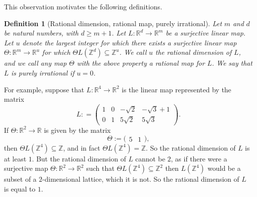 \documentclass[12pt,a4paper,twoside,reqno]{amsart}
\newtheorem{Definition}[Theorem]{Definition}
\newtheorem{Remark}[Theorem]{Remark}
\numberwithin{equation}{section}
\begin{document}
This observation motivates the following definitions.

\begin{Definition}[Rational dimension, rational map, purely irrational]
\label{Definition rational space}
Let $m$ and $d$ be natural numbers, with $d\geqslant m+1$. Let $L:\mathbb{R}^d\longrightarrow \mathbb{R}^m$ be a surjective linear map. Let $u$ denote the largest integer for which there exists a surjective linear map $\Theta:\mathbb{R}^m \longrightarrow \mathbb{R}^u$ for which $\Theta L (\mathbb{Z}^d) \subseteq \mathbb{Z}^u$. We call $u$ the \emph{rational dimension} of $L$, and we call any map $\Theta$ with the above property a \emph{rational map} for $L$. We say that $L$ is \emph{purely irrational} if $u=0$. 
\end{Definition}
\noindent For example, suppose that $L:\mathbb{R}^4 \longrightarrow \mathbb{R}^2$ is the linear map represented by the matrix \[ L: = \left(\begin{matrix} 1 & 0 & -\sqrt{2} & -\sqrt{3} + 1 \\
0 & 1 & 5\sqrt{2} & 5\sqrt{3} \end{matrix} \right).\] If $\Theta:\mathbb{R}^2 \longrightarrow \mathbb{R}$ is given by the matrix \[ \Theta:= \Big(\begin{matrix} 5 & 1 \end{matrix} \Big),\] then $\Theta L (\mathbb{Z}^4) \subseteq \mathbb{Z}$, and in fact $\Theta L (\mathbb{Z}^4) = \mathbb{Z}$. So the rational dimension of $L$ is at least $1$. But the rational dimension of $L$ cannot be $2$, as if there were a surjective map $\Theta:\mathbb{R}^2 \longrightarrow \mathbb{R}^2$ such that $\Theta L (\mathbb{Z}^4) \subseteq \mathbb{Z}^2$ then $L(\mathbb{Z}^4)$ would be a subset of a $2$-dimensional lattice, which it is not. So the rational dimension of $L$ is equal to $1$.\\

\end{document}
